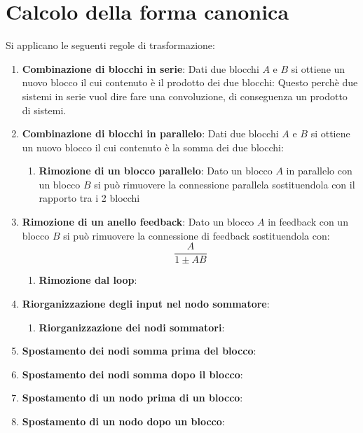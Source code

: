 \documentclass[a4paper]{article}
\begin{document}
\section{Calcolo della forma canonica}
Si applicano le seguenti regole di trasformazione:
\begin{enumerate}
  \item \textbf{Combinazione di blocchi in serie}: Dati due blocchi \( A \) e \( B \) si
    ottiene un nuovo blocco il cui contenuto è il prodotto dei due blocchi:
    \label{25-11-D15}
    \noindent
    Questo perchè due sistemi in serie vuol dire fare una convoluzione, di conseguenza
    un prodotto di sistemi.

  \item \textbf{Combinazione di blocchi in parallelo}: Dati due blocchi \( A \) e \( B \) si
    ottiene un nuovo blocco il cui contenuto è la somma dei due blocchi:
    \label{25-11-D16}
    \begin{enumerate}
      \item \textbf{Rimozione di un blocco parallelo}: Dato un blocco \( A \) in parallelo
        con un blocco \( B \) si può rimuovere la connessione parallela sostituendola con
        il rapporto tra i 2 blocchi
        \label{25-11-D17}
    \end{enumerate}


  \item \textbf{Rimozione di un anello feedback}: Dato un blocco \( A \) in feedback con
    un blocco \( B \) si può rimuovere la connessione di feedback sostituendola con:
    \[
    \frac{A}{1 \pm AB}
    \] 
    \label{25-11-D18}

    \begin{enumerate}
      \item \textbf{Rimozione dal loop}: 
        \label{25-11-D19}
    \end{enumerate}

  \item \textbf{Riorganizzazione degli input nel nodo sommatore}:
    \label{25-11-D20}
    \begin{enumerate}
      \item \textbf{Riorganizzazione dei nodi sommatori}:
        \label{25-11-D21}
    \end{enumerate}

  \item \textbf{Spostamento dei nodi somma prima del blocco}:
    \label{25-11-D22}

  \item \textbf{Spostamento dei nodi somma dopo il blocco}:
    \label{25-11-D23}

  \item \textbf{Spostamento di un nodo prima di un blocco}:
    \label{25-11-D24}

  \item \textbf{Spostamento di un nodo dopo un blocco}:
    \label{25-11-D25}
\end{enumerate}
\end{document}
